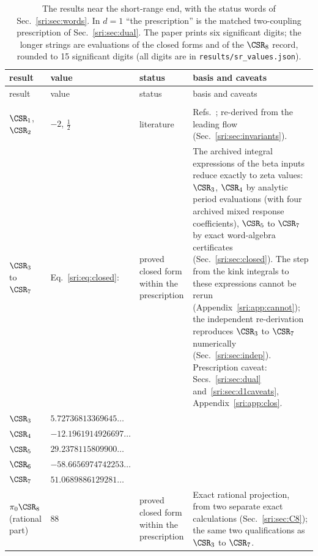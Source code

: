 {\small
\renewcommand{\arraystretch}{1.2}
\begin{longtable}{@{}>{\raggedright\arraybackslash}p{}>{\raggedright\arraybackslash}p{}>{\raggedright\arraybackslash}p{}>{\raggedright\arraybackslash}p{}@{}}
\caption{The results near the short-range end, with the status words of Sec.~\ref{sri:sec:words}. In $d=1$ ``the
prescription'' is the matched two-coupling prescription of Sec.~\ref{sri:sec:dual}. The paper prints six significant
digits; the longer strings are evaluations of the closed forms and of the $\CSR_8$ record, rounded to 15 significant
digits (all digits are in \texttt{results/sr\_values.json}).}\label{sri:tab:main}\\
\toprule
result & value & status & basis and caveats\\
\midrule\endfirsthead
\toprule
result & value & status & basis and caveats\\
\midrule\endhead
\bottomrule\endfoot
\multicolumn{4}{@{}l}{$d=1$}\\
$\CSR_1$, $\CSR_2$ & $-2$, $\frac12$ & literature & Refs.~\cite{sri:Benedetti:2024wgx,sri:Benedetti:2025nzp}; re-derived from the leading flow (Sec.~\ref{sri:sec:invariants}).\\
$\CSR_3$ to $\CSR_7$ & Eq.~\eqref{sri:eq:closed}: & proved closed form within the prescription & The archived integral expressions of the beta inputs reduce exactly to zeta values: $\CSR_3$, $\CSR_4$ by analytic period evaluations (with four archived mixed response coefficients), $\CSR_5$ to $\CSR_7$ by exact word-algebra certificates (Sec.~\ref{sri:sec:closed}). The step from the kink integrals to these expressions cannot be rerun (Appendix~\ref{sri:app:cannot}); the independent re-derivation reproduces $\CSR_3$ to $\CSR_7$ numerically (Sec.~\ref{sri:sec:indep}). Prescription caveat: Secs.~\ref{sri:sec:dual} and~\ref{sri:sec:d1caveats}, Appendix~\ref{sri:app:clos}.\\
\quad$\CSR_3$ & $5.72736813369645\ldots$ & & \\
\quad$\CSR_4$ & $-12.1961914926697\ldots$ & & \\
\quad$\CSR_5$ & $29.2378115809900\ldots$ & & \\
\quad$\CSR_6$ & $-58.6656974742253\ldots$ & & \\
\quad$\CSR_7$ & $51.0689886129281\ldots$ & & \\
$\pi_0\CSR_8$ (rational part) & $88$ & proved closed form within the prescription & Exact rational projection, from two separate exact calculations (Sec.~\ref{sri:sec:C8}); the same two qualifications as $\CSR_3$ to $\CSR_7$.\\

\end{longtable}}
